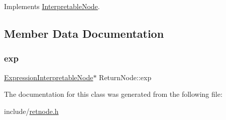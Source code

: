 Implements \hyperlink{classInterpretableNode_a9a466e7d65c4b323d2b96b4ac8396cd7}{Interpretable\+Node}.



\subsection{Member Data Documentation}
\mbox{\label{classReturnNode_a27f21d586d90935184261ea34cf2a253}} 
\subsubsection{\texorpdfstring{exp}{exp}}
{\footnotesize\ttfamily \hyperlink{classExpressionInterpretableNode}{Expression\+Interpretable\+Node}$\ast$ Return\+Node\+::exp}



The documentation for this class was generated from the following file\+:\begin{DoxyCompactItemize}
\item 
include/\hyperlink{retnode_8h}{retnode.\+h}\end{DoxyCompactItemize}

